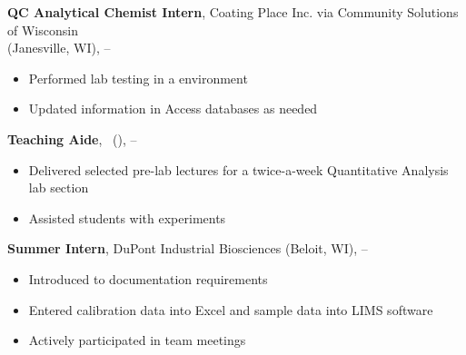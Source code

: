 \textbf{QC Analytical Chemist Intern}, Coating Place Inc. via Community Solutions of Wisconsin\\ 
(Janesville, WI),  -- \\
\begin{itemize}
\setlength\itemsep{0pt}
\item Performed lab testing in a \GMP environment\\
\item Updated information in \MS Access databases as needed\\
\end{itemize}


\newpage

\textbf{Teaching Aide}, \UWW \ (\UlocA),  -- \\
\begin{itemize}
\setlength\itemsep{0pt}
\item Delivered selected pre-lab lectures for a twice-a-week Quantitative Analysis lab section\\ 
\item Assisted students with experiments\\
\end{itemize}

\textbf{Summer Intern}, DuPont Industrial Biosciences (Beloit, WI),  -- \\ 
\begin{itemize}
\item Introduced to \GMP documentation requirements\\ 
\item Entered calibration data into \MS Excel and sample data into LIMS software\\
\item Actively participated in team meetings\\
\end{itemize}


